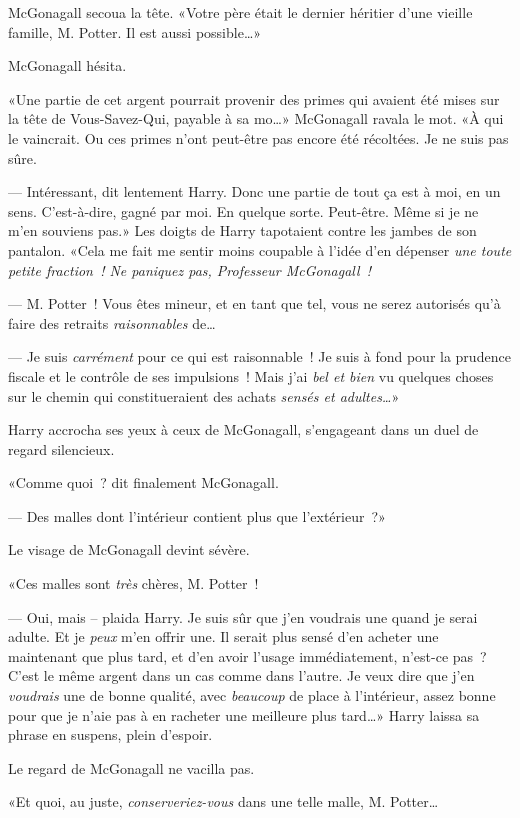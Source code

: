 McGonagall secoua la tête. «Votre père était le dernier héritier d'une vieille famille, M. Potter. Il est aussi possible…»

McGonagall hésita.

«Une partie de cet argent pourrait provenir des primes qui avaient été mises sur la tête de Vous-Savez-Qui, payable à sa mo…» McGonagall ravala le mot. «À qui le vaincrait. Ou ces primes n'ont peut-être pas encore été récoltées. Je ne suis pas sûre.

--- Intéressant, dit lentement Harry. Donc une partie de tout ça est à moi, en un sens. C'est-à-dire, gagné par moi. En quelque sorte. Peut-être. Même si je ne m'en souviens pas.» Les doigts de Harry tapotaient contre les jambes de son pantalon. «Cela me fait me sentir moins coupable à l'idée d'en dépenser \emph{une toute petite fraction~! Ne paniquez pas, Professeur McGonagall~!}

--- M. Potter~! Vous êtes mineur, et en tant que tel, vous ne serez autorisés qu'à faire des retraits \emph{raisonnables} de…

--- Je suis \emph{carrément} pour ce qui est raisonnable~! Je suis à fond pour la prudence fiscale et le contrôle de ses impulsions~! Mais j'ai \emph{bel et bien} vu quelques choses sur le chemin qui constitueraient des achats \emph{sensés et adultes…}»

Harry accrocha ses yeux à ceux de McGonagall, s'engageant dans un duel de regard silencieux.

«Comme quoi~? dit finalement McGonagall.

--- Des malles dont l'intérieur contient plus que l'extérieur~?»

Le visage de McGonagall devint sévère.

«Ces malles sont \emph{très} chères, M. Potter~!

--- Oui, mais -- plaida Harry. Je suis sûr que j'en voudrais une quand je serai adulte. Et je \emph{peux} m'en offrir une. Il serait plus sensé d'en acheter une maintenant que plus tard, et d'en avoir l'usage immédiatement, n'est-ce pas~? C'est le même argent dans un cas comme dans l'autre. Je veux dire que j'en \emph{voudrais} une de bonne qualité, avec \emph{beaucoup} de place à l'intérieur, assez bonne pour que je n'aie pas à en racheter une meilleure plus tard…» Harry laissa sa phrase en suspens, plein d'espoir.

Le regard de McGonagall ne vacilla pas.

«Et quoi, au juste, \emph{conserveriez-vous} dans une telle malle, M. Potter…

